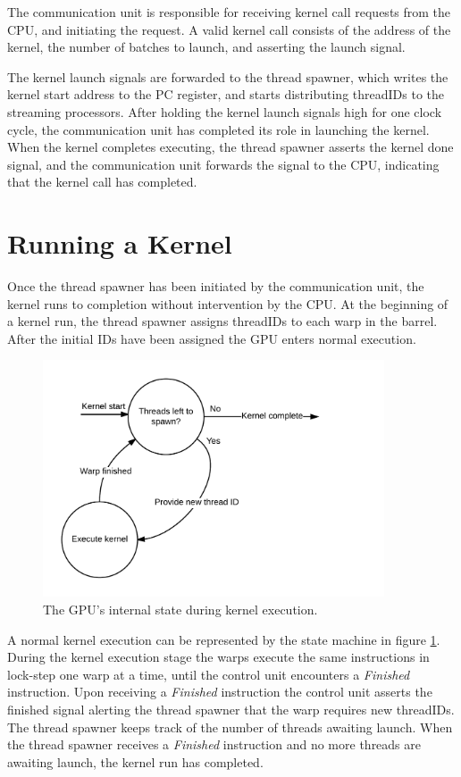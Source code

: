 \documentclass[../main/report.tex]{subfiles}
\begin{document}
The communication unit is responsible for receiving kernel call requests from the CPU, and initiating the request.
A valid kernel call consists of the address of the kernel, the number of batches to launch, and asserting the launch signal.

The kernel launch signals are forwarded to the thread spawner, which writes the kernel start address to the PC register, and starts distributing threadIDs to the streaming processors. 
After holding the kernel launch signals high for one clock cycle, the communication unit has completed its role in launching the kernel.
When the kernel completes executing, the thread spawner asserts the kernel done signal, and the communication unit forwards the signal to the CPU, indicating that the kernel call has completed.


\section{Running a Kernel}
Once the thread spawner has been initiated by the communication unit, the kernel runs to completion without intervention by the CPU. 
At the beginning of a kernel run, the thread spawner assigns threadIDs to each warp in the barrel.
After the initial IDs have been assigned the GPU enters normal execution.
\begin{figure}[H]
	\centering
	\includegraphics[width=0.9\textwidth]{../gpu/diagrams/kernel_run_state_machine.png}
	\caption{The GPU's internal state during kernel execution.}
	\label{fig:kernel_run_state_machine}
\end{figure}
A normal kernel execution can be represented by the state machine in figure \ref{fig:kernel_run_state_machine}.
During the kernel execution stage the warps execute the same instructions in lock-step one warp at a time, until the control unit encounters a \textit{Finished} instruction.
Upon receiving a \textit{Finished} instruction the control unit asserts the finished signal alerting the thread spawner that the warp requires new threadIDs.
The thread spawner keeps track of the number of threads awaiting launch.
When the thread spawner receives a \textit{Finished} instruction and no more threads are awaiting launch, the kernel run has completed.
\end{document}
